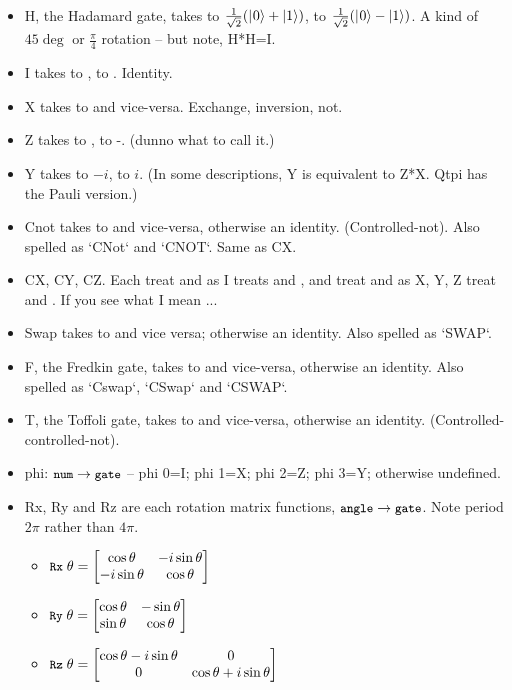 \begin{itemize}
\item  H, the Hadamard gate, takes \zero{} to $\frac{1}{\sqrt{2}}(|\hspace{0.5pt}0\rangle+|1\rangle\relax)$, \one{} to $\frac{1}{\sqrt{2}}(|\hspace{0.5pt}0\rangle-|1\rangle\relax)$. A kind of $45\deg$ or $\frac{\pi}{4}$ rotation -- but note, H*H=I.
\item I takes \zero{} to \zero, \one{} to \one. Identity.
\item X  takes \zero{} to \one{} and vice-versa. Exchange, inversion, not.
\item Z  takes \zero{} to \zero, \one{} to -\one{}. (dunno what to call it.)
\item Y  takes \zero{} to $-i$\one{}, \one{} to $i$\zero{}. (In some descriptions, Y is equivalent to Z*X. Qtpi has the Pauli version.)
\item Cnot takes \onezero{} to \oneone{} and vice-versa, otherwise an identity. (Controlled-not). Also spelled as `CNot` and `CNOT`. Same as CX.
\item CX, CY, CZ. Each treat \zerozero{} and \zeroone{} as I treats \zero{} and \one, and treat \onezero{} and \oneone{} as X, Y, Z treat \zero{} and \one{}. If you see what I mean ...
\item Swap takes \zeroone{} to \onezero{} and vice versa; otherwise an identity. Also spelled as `SWAP`.
\item F, the Fredkin gate, takes \onezeroone{} to \oneonezero{} and vice-versa, otherwise an identity. Also spelled as `Cswap`, `CSwap` and `CSWAP`.
\item T, the Toffoli gate, takes \oneonezero{} to \oneoneone{} and vice-versa, otherwise an identity. (Controlled-controlled-not). \vspace{5pt}

\item phi: $\texttt{\small{}num}->\texttt{\small{}gate}$ -- phi 0=I; phi 1=X; phi 2=Z; phi 3=Y; otherwise undefined. \vspace{5pt}

\item Rx, Ry and Rz are each rotation matrix functions, $\texttt{\small{}angle}->\texttt{\small{}gate}$. Note period $2\pi$ rather than $4\pi$.
  \begin{itemize}
  \item $\texttt{\small{}Rx}\;\theta = \left[\begin{matrix}\cos\theta&-i\sin\theta\\-i\sin\theta&\cos\theta\end{matrix}\right]$
  \item $\texttt{\small{}Ry}\;\theta = \left[\begin{matrix}\cos\theta&-\sin\theta\\\sin\theta&\cos\theta\end{matrix}\right]$
  \item $\texttt{\small{}Rz}\;\theta = \left[\begin{matrix}\cos\theta-i\sin\theta&0\\0&\cos\theta+i\sin\theta\end{matrix}\right]$
  \end{itemize}
\end{itemize}
  
